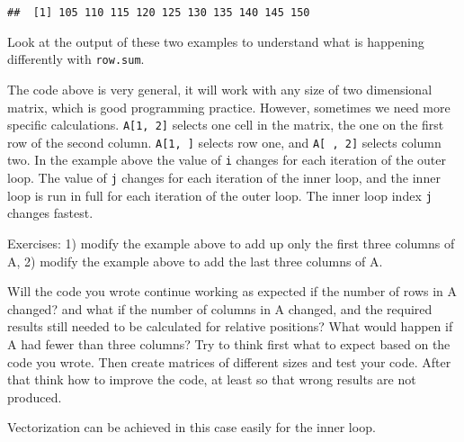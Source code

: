 \documentclass[paper=a4,10pt,div=17,headsepline,BCOR=12mm,twoside,open=right]{scrbook}\usepackage{knitr}
\begin{document}
\begin{knitrout}\footnotesize
{}\color{fgcolor}\begin{kframe}
\begin{alltt}
 \hlkwb{<-} \hlstd{(} 
   \hlopt{:}
   \hlkwb{<-} 
     \hlopt{:}
     \hlkwb{<-}  \hlopt{+} 
\hlstd{\}}
\end{alltt}
\begin{verbatim}
##  [1] 105 110 115 120 125 130 135 140 145 150
\end{verbatim}
\end{kframe}
\end{knitrout}

Look at the output of these two examples to understand what is happening differently with \texttt{row.sum}.

The code above is very general, it will work with any size of two dimensional matrix, which is good programming practice. However, sometimes we need more specific calculations. \texttt{A[1, 2]} selects one cell in the matrix, the one on the first row of the second column. \texttt{A[1, ]} selects row one, and  \texttt{A[ , 2]} selects column two. In the example above the value of \texttt{i} changes for each iteration of the outer loop. The value of \texttt{j} changes for each iteration of the inner loop, and the inner loop is run in full for each iteration of the outer loop. The inner loop index \texttt{j} changes fastest.

Exercises: 1) modify the example above to add up only the first three columns of A, 2) modify the example above to add the last three columns of A.

Will the code you wrote continue working as expected if the number of rows in A changed? and what if the number of columns in A changed, and the required results still needed to be calculated for relative positions? What would happen if A had fewer than three columns? Try to think first what to expect based on the code you wrote. Then create matrices of different sizes and test your code. After that think how to improve the code, at least so that wrong results are not produced.

Vectorization can be achieved in this case easily for the inner loop.
\end{document}
